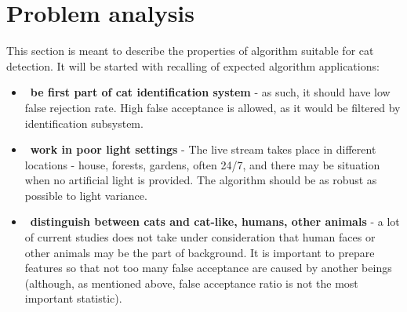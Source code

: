 \documentclass[hyperref]{acmtrans2e}
\begin{document}
\section{Problem analysis}
This section is meant to describe the properties of algorithm suitable for cat detection. It will be started with recalling of expected algorithm applications:
\begin{itemize}
\item~\textbf{be first part of cat identification system} - as such, it should have low false rejection rate. High false acceptance is allowed, as it would be filtered by identification subsystem.
\item~\textbf{work in poor light settings} - The live stream takes place in different locations - house, forests, gardens, often 24/7, and there may be situation when no artificial light is provided. The algorithm should be as robust as possible to light variance.
\item~\textbf{distinguish between cats and cat-like, humans, other animals} - a lot of current studies does not take under consideration that human faces or other animals may be the part of background. It is important to prepare features so that not too many false acceptance are caused by another beings (although, as mentioned above, false acceptance ratio is not the most important statistic).
\end{itemize}
\end{document}
